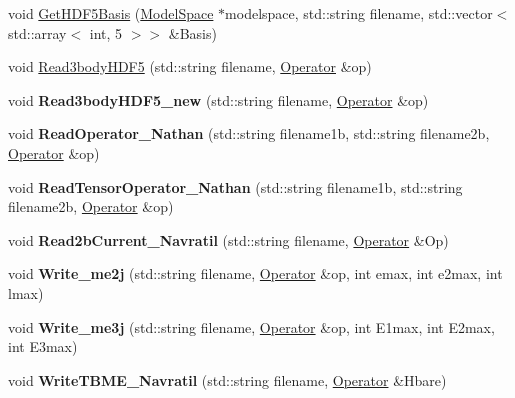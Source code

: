 \begin{DoxyCompactItemize}
\item 
void \hyperlink{classReadWrite_afd7a125b17416dff8f734552162f9452}{Get\+H\+D\+F5\+Basis} (\hyperlink{classModelSpace}{Model\+Space} $\ast$modelspace, std\+::string filename, std\+::vector$<$ std\+::array$<$ int, 5 $>$$>$ \&Basis)
\item 
void \hyperlink{classReadWrite_aecf5aed45944f3bd24c376478ee939dc}{Read3body\+H\+D\+F5} (std\+::string filename, \hyperlink{classOperator}{Operator} \&op)
\item 
\mbox{\label{classReadWrite_a4f698e59260545020e81e712b8ebd082}} 
void {\bfseries Read3body\+H\+D\+F5\+\_\+new} (std\+::string filename, \hyperlink{classOperator}{Operator} \&op)
\item 
\mbox{\label{classReadWrite_aff6263030fa24814f665607ab36d69ae}} 
void {\bfseries Read\+Operator\+\_\+\+Nathan} (std\+::string filename1b, std\+::string filename2b, \hyperlink{classOperator}{Operator} \&op)
\item 
\mbox{\label{classReadWrite_a0b84a7079b2a9b63377a7f8c25c82cdc}} 
void {\bfseries Read\+Tensor\+Operator\+\_\+\+Nathan} (std\+::string filename1b, std\+::string filename2b, \hyperlink{classOperator}{Operator} \&op)
\item 
\mbox{\label{classReadWrite_a35b62568c269af2bd24ee1793fe2099e}} 
void {\bfseries Read2b\+Current\+\_\+\+Navratil} (std\+::string filename, \hyperlink{classOperator}{Operator} \&Op)
\item 
\mbox{\label{classReadWrite_a9bf725085e4eff9e08bc520d05304b11}} 
void {\bfseries Write\+\_\+me2j} (std\+::string filename, \hyperlink{classOperator}{Operator} \&op, int emax, int e2max, int lmax)
\item 
\mbox{\label{classReadWrite_ae819eac7b4bfc06bb97c2e784d8cd970}} 
void {\bfseries Write\+\_\+me3j} (std\+::string filename, \hyperlink{classOperator}{Operator} \&op, int E1max, int E2max, int E3max)
\item 
\mbox{\label{classReadWrite_ab28536eec0349d76457a727f0648da11}} 
void {\bfseries Write\+T\+B\+M\+E\+\_\+\+Navratil} (std\+::string filename, \hyperlink{classOperator}{Operator} \&Hbare)
\item 
$$
\end{DoxyCompactItemize}
